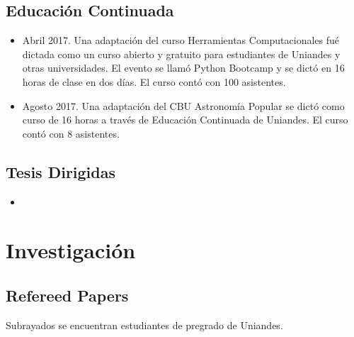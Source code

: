 \documentclass{article}
\begin{document}
\subsection{Educaci\'on Continuada}
\begin{itemize}
\item Abril 2017. Una adaptaci\'on del curso Herramientas Computacionales fu\'e
  dictada como un curso abierto y gratuito para estudiantes de
  Uniandes y otras universidades. El evento se llam\'o Python Bootcamp
  y se dict\'o en 16 horas de clase en dos d\'ias. El curso cont\'o
  con 100 asistentes. %
\item Agosto 2017. Una adaptaci\'on del CBU Astronom\'ia Popular se dict\'o como
  curso de 16 horas a trav\'es de Educaci\'on Continuada de
  Uniandes. El curso cont\'o con 8 asistentes.
\end{itemize}



\subsection{Tesis Dirigidas}

\begin{itemize}
\item 
\end{itemize}

\newpage
\section{Investigaci\'on}

\subsection{Refereed Papers}

Subrayados se encuentran estudiantes de pregrado de Uniandes.
\end{document}
